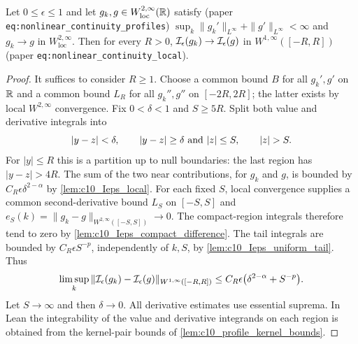 \begin{lemma}
  \label{lem:c10_Ieps_local_continuity}
  Let $0\le\epsilon\le1$ and let $g_k,g\in W^{2,\infty}_{\mathrm{loc}}(\mathbb{R})$ satisfy (paper
  \texttt{eq:nonlinear\_continuity\_profiles}) $\sup_k\|g_k'\|_{L^\infty}+\|g'\|_{L^\infty}<\infty$ and
  $g_k\to g$ in $W^{2,\infty}_{\mathrm{loc}}$. Then for every $R>0$,
  $\mathcal{I}_\epsilon(g_k)\to\mathcal{I}_\epsilon(g)$ in $W^{1,\infty}([-R,R])$ (paper \texttt{eq:nonlinear\_continuity\_local}).
\end{lemma}
\begin{proof}
  It suffices to consider $R\ge1$. Choose a common bound $B$ for all $g_k',g'$ on $\mathbb{R}$ and a
  common bound $L_R$ for all $g_k'',g''$ on $[-2R,2R]$; the latter exists by local $W^{2,\infty}$
  convergence. Fix $0<\delta<1$ and $S\ge5R$. Split both value and derivative integrals into
  \[
    |y-z|<\delta,\qquad |y-z|\ge\delta\ \hbox{and}\ |z|\le S,\qquad |z|>S .
  \]
  For $|y|\le R$ this is a partition up to null boundaries: the last region has $|y-z|>4R$.
  The sum of the two near contributions, for $g_k$ and $g$, is bounded by
  $C_R\epsilon\delta^{2-\alpha}$ by \cref{lem:c10_Ieps_local}.
  For each fixed $S$, local convergence supplies a common second-derivative bound $L_S$ on
  $[-S,S]$ and $e_S(k)=\|g_k-g\|_{W^{2,\infty}([-S,S])}\to0$.
  The compact-region integrals therefore tend to zero by \cref{lem:c10_Ieps_compact_difference}.
  The tail integrals are bounded by $C_R\epsilon S^{-p}$, independently of $k,S$, by
  \cref{lem:c10_Ieps_uniform_tail}. Thus
  \[
    \limsup_k\|\mathcal{I}_\epsilon(g_k)-\mathcal{I}_\epsilon(g)\|_{W^{1,\infty}([-R,R])}
        \le C_R\epsilon\bigl(\delta^{2-\alpha}+S^{-p}\bigr).
  \]
  Let $S\to\infty$ and then $\delta\to0$. All derivative estimates use essential suprema.
  In Lean the integrability of the value and derivative integrands on each region is obtained from the kernel-pair bounds of \cref{lem:c10_profile_kernel_bounds}.
\end{proof}

